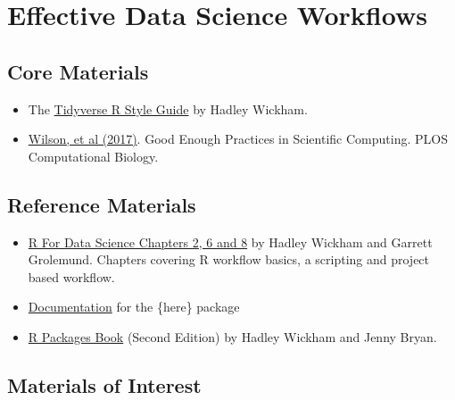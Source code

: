 \documentclass[
  12pt,
]{book}
\providecommand{\tightlist}{%
  \setlength{\itemsep}{0pt}\setlength{\parskip}{0pt}}
\begin{document}
\hypertarget{workflows-reading}{%
\section{Effective Data Science Workflows}\label{workflows-reading}}

\hypertarget{core-materials}{%
\subsection*{Core Materials}\label{core-materials}}

\begin{itemize}
\tightlist
\item
  The \href{https://style.tidyverse.org/}{Tidyverse R Style Guide} by Hadley Wickham.
\end{itemize}

\begin{itemize}
\tightlist
\item
  \href{https://journals.plos.org/ploscompbiol/article?id=10.1371/journal.pcbi.1005510\&ref=https://githubhelp.com}{Wilson, et al (2017)}. Good Enough Practices in Scientific Computing. PLOS Computational Biology.
\end{itemize}

\hypertarget{reference-materials}{%
\subsection*{Reference Materials}\label{reference-materials}}

\begin{itemize}
\item
  \href{https://r4ds.had.co.nz/index.html}{R For Data Science Chapters 2, 6 and 8} by Hadley Wickham and Garrett Grolemund. Chapters covering R workflow basics, a scripting and project based workflow.
\item
  \href{https://here.r-lib.org/articles/here.html}{Documentation} for the \{here\} package
\item
  \href{https://r-pkgs.org/}{R Packages Book} (Second Edition) by Hadley Wickham and Jenny Bryan.
\end{itemize}

\hypertarget{materials-of-interest}{%
\subsection*{Materials of Interest}\label{materials-of-interest}}
\end{document}
